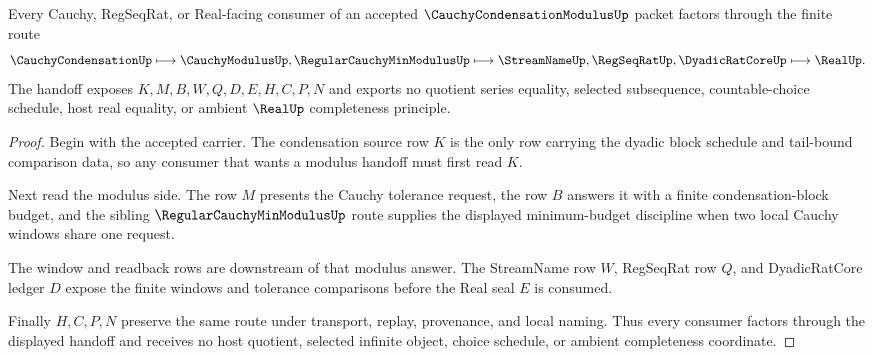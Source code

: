 \begin{theorem}
\label{thm:cauchy-condensation-modulus-condensation-handoff}
Every Cauchy, RegSeqRat, or Real-facing consumer of an accepted $\CauchyCondensationModulusUp$ packet factors through the finite route
$$
\CauchyCondensationUp
\longmapsto
\CauchyModulusUp,\RegularCauchyMinModulusUp
\longmapsto
\StreamNameUp,\RegSeqRatUp,\DyadicRatCoreUp
\longmapsto
\RealUp .
$$
The handoff exposes $K,M,B,W,Q,D,E,H,C,P,N$ and exports no quotient series equality, selected subsequence, countable-choice schedule, host real equality, or ambient $\RealUp$ completeness principle.
\end{theorem}
\begin{proof}
Begin with the accepted carrier. The condensation source row $K$ is the only row carrying the dyadic block schedule and tail-bound comparison data, so any consumer that wants a modulus handoff must first read $K$.

Next read the modulus side. The row $M$ presents the Cauchy tolerance request, the row $B$ answers it with a finite condensation-block budget, and the sibling $\RegularCauchyMinModulusUp$ route supplies the displayed minimum-budget discipline when two local Cauchy windows share one request.

The window and readback rows are downstream of that modulus answer. The StreamName row $W$, RegSeqRat row $Q$, and DyadicRatCore ledger $D$ expose the finite windows and tolerance comparisons before the Real seal $E$ is consumed.

Finally $H,C,P,N$ preserve the same route under transport, replay, provenance, and local naming. Thus every consumer factors through the displayed handoff and receives no host quotient, selected infinite object, choice schedule, or ambient completeness coordinate.
\end{proof}



